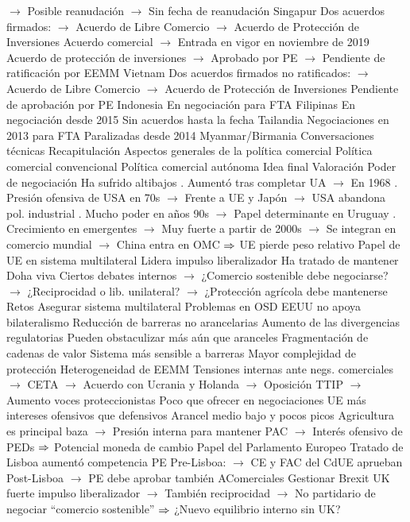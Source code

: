 \documentclass{nuevotema}
\begin{document}
\begin{esquemal}
				\4[] $\to$ Posible reanudación
				\4[] $\to$ Sin fecha de reanudación
				\4 Singapur
				\4[] Dos acuerdos firmados:
				\4[] $\to$ Acuerdo de Libre Comercio
				\4[] $\to$ Acuerdo de Protección de Inversiones
				\4[] Acuerdo comercial
				\4[] $\to$ Entrada en vigor en noviembre de 2019
				\4[] Acuerdo de protección de inversiones
				\4[] $\to$ Aprobado por PE
				\4[] $\to$ Pendiente de ratificación por EEMM
				\4 Vietnam
				\4[] Dos acuerdos firmados no ratificados:
				\4[] $\to$ Acuerdo de Libre Comercio
				\4[] $\to$ Acuerdo de Protección de Inversiones
				\4[] Pendiente de aprobación por PE
				\4 Indonesia
				\4[] En negociación para FTA
				\4 Filipinas
				\4[] En negociación desde 2015
				\4[] Sin acuerdos hasta la fecha
				\4 Tailandia
				\4[] Negociaciones en 2013 para FTA
				\4[] Paralizadas desde 2014
				\4 Myanmar/Birmania
				\4[] Conversaciones técnicas
	\1[] 
		\2 Recapitulación
			\3 Aspectos generales de la política comercial
			\3 Política comercial convencional
			\3 Política comercial autónoma
		\2 Idea final
			\3 Valoración
				\4 Poder de negociación
				\4[] Ha sufrido altibajos
				. Aumentó tras completar UA
				\4[] $\to$ En 1968
				. Presión ofensiva de USA en 70s
				\4[] $\to$ Frente a UE y Japón
				\4[] $\to$ USA abandona pol. industrial
				. Mucho poder en años 90s
				\4[] $\to$ Papel determinante en Uruguay
				. Crecimiento en emergentes
				\4[] $\to$ Muy fuerte a partir de 2000s
				\4[] $\to$ Se integran en comercio mundial
				\4[] $\to$ China entra en OMC
				\4[] $\Rightarrow$ UE pierde peso relativo
				\4 Papel de UE en sistema multilateral
				\4[] Lidera impulso liberalizador
				\4[] Ha tratado de mantener Doha viva
				\4[] Ciertos debates internos
				\4[] $\to$ ¿Comercio sostenible debe negociarse?
				\4[] $\to$ ¿Reciprocidad o lib. unilateral?
				\4[] $\to$ ¿Protección agrícola debe mantenerse
			\3 Retos
				\4 Asegurar sistema multilateral
				\4[] Problemas en OSD
				\4[] EEUU no apoya bilateralismo
				\4 Reducción de barreras no arancelarias
				\4[] Aumento de las divergencias regulatorias
				\4[] Pueden obstaculizar más aún que aranceles
				\4 Fragmentación de cadenas de valor
				\4[] Sistema más sensible a barreras
				\4[] Mayor complejidad de protección
				\4 Heterogeneidad de EEMM
				\4[] Tensiones internas ante negs. comerciales
				\4[] $\to$ CETA
				\4[] $\to$ Acuerdo con Ucrania y Holanda
				\4[] $\to$ Oposición TTIP
				\4[] $\to$ Aumento voces proteccionistas
				\4 Poco que ofrecer en negociaciones
				\4[] UE más intereses ofensivos que defensivos
				\4[] Arancel medio bajo y pocos picos
				\4[] Agricultura es principal baza
				\4[] $\to$ Presión interna para mantener PAC
				\4[] $\to$ Interés ofensivo de PEDs
				\4[] $\Rightarrow$ Potencial moneda de cambio
				\4 Papel del Parlamento Europeo
				\4[] Tratado de Lisboa aumentó competencia PE
				\4[] Pre-Lisboa:
				\4[] $\to$ CE y FAC del CdUE aprueban
				\4[] Post-Lisboa
				\4[] $\to$ PE debe aprobar también AComerciales
				\4 Gestionar Brexit
				\4[] UK fuerte impulso liberalizador
				\4[] $\to$ También reciprocidad
				\4[] $\to$ No partidario de negociar ``comercio sostenible''
				\4[] $\Rightarrow$ ¿Nuevo equilibrio interno sin UK?
\end{esquemal}
\end{document}
